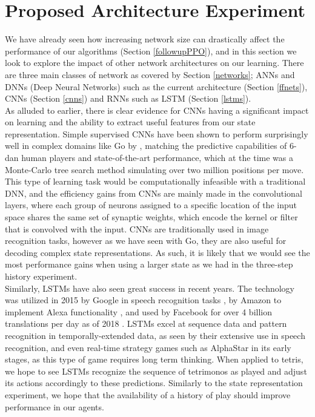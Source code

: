 \documentclass[12pt]{article}
\begin{document}
\section{Proposed Architecture Experiment}\label{proposed}
We have already seen how increasing network size can drastically affect the performance of our algorithms (Section \ref{followupPPO}), and in this section we look to explore the impact of other network architectures on our learning. There are three main classes of network as covered by Section \ref{networks}; ANNs and DNNs (Deep Neural Networks) such as the current architecture (Section \ref{ffnets}), CNNs (Section \ref{cnns}) and RNNs such as LSTM (Section \ref{lstms}).\\\newline
As alluded to earlier, there is clear evidence for CNNs having a significant impact on learning and the ability to extract useful features from our state representation. Simple supervised CNNs have been shown to perform surprisingly well in complex domains like Go by \textcite{gomoves}, matching the predictive capabilities of 6-dan human players and state-of-the-art performance, which at the time was a Monte-Carlo tree search method simulating over two million positions per move. This type of learning task would be computationally infeasible with a traditional DNN, and the efficiency gains from CNNs are mainly made in the convolutional layers, where each group of neurons assigned to a specific location of the input space shares the same set of synaptic weights, which encode the kernel or filter that is convolved with the input. CNNs are traditionally used in image recognition tasks, however as we have seen with Go, they are also useful for decoding complex state representations. As such, it is likely that we would see the most performance gains when using a larger state as we had in the three-step history experiment. \\\newline
Similarly, LSTMs have also seen great success in recent years. The technology was utilized in 2015 by Google in speech recognition tasks \autocite{sak_senior_rao_beaufays_schalkwyk_2015}, by Amazon to implement Alexa functionality \autocite{vogels_2016}, and used by Facebook for over 4 billion translations per day as of 2018 \autocite{sidorov_2018}. LSTMs excel at sequence data and pattern recognition in temporally-extended data, as seen by their extensive use in speech recognition, and even real-time strategy games such as AlphaStar \autocite{Vinyals2019} in its early stages, as this type of game requires long term thinking. When applied to tetris, we hope to see LSTMs recognize the sequence of tetrimonos as played and adjust its actions accordingly to these predictions. Similarly to the state representation experiment, we hope that the availability of a history of play should improve performance in our agents. \\\newline
\end{document}
